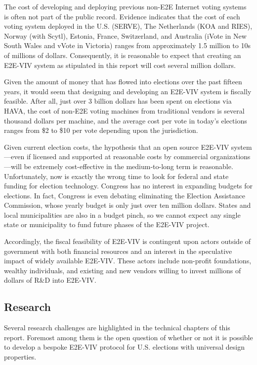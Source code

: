 The cost of developing and deploying previous non-E2E Internet voting
systems is often not part of the public record.  Evidence indicates
that the cost of each voting system deployed in the U.S. (SERVE), The
Netherlands (KOA and RIES), Norway (with Scytl), Estonia, France,
Switzerland, and Australia (iVote in New South Wales and vVote in
Victoria) ranges from approximately 1.5 million to 10s of millions of
dollars. Consequently, it is reasonable to expect that creating an
E2E-VIV system as stipulated in this report will cost several million
dollars.

Given the amount of money that has flowed into elections over the past
fifteen years, it would seem that designing and developing an E2E-VIV
system is fiscally feasible. After all, just over 3 billion dollars
has been spent on elections via HAVA, the cost of non-E2E voting
machines from traditional vendors is several thousand dollars per
machine, and the average cost per vote in today's elections ranges
from \$2 to \$10 per vote depending upon the jurisdiction.

Given current election costs, the hypothesis that an open source
E2E-VIV system---even if licensed and supported at reasonable costs by
commercial organizations---will be extremely cost-effective in the
medium-to-long term is reasonable. Unfortunately, now is exactly the
wrong time to look for federal and state funding for election
technology.  Congress has no interest in expanding budgets for
elections. In fact, Congress is even debating eliminating the Election
Assistance Commission, whose yearly budget is only just over ten
million dollars. States and local municipalities are also in a budget
pinch, so we cannot expect any single state or municipality to fund
future phases of the E2E-VIV project.

Accordingly, the fiscal feasibility of E2E-VIV is contingent upon
actors outside of government with both financial resources and an
interest in the speculative impact of widely available E2E-VIV.  These
actors include non-profit foundations, wealthy individuals, and
existing and new vendors willing to invest millions of dollars of R\&D
into E2E-VIV.

\subsection{Research}

Several research challenges are highlighted in the technical chapters
of this report.  Foremost among them is the open question of whether
or not it is possible to develop a bespoke E2E-VIV protocol for
U.S. elections with universal design properties.


